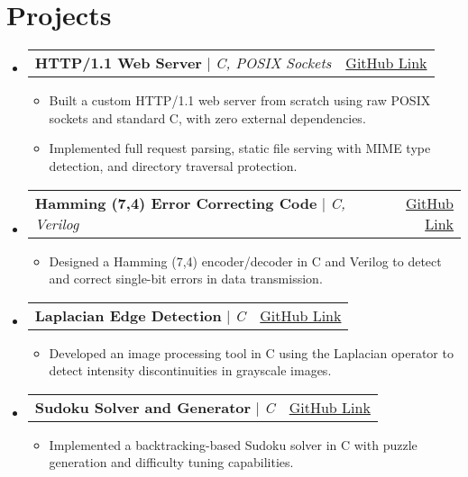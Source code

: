\documentclass[letterpaper,11pt]{article}
\makeatletter
\newcommand{\resumeItem}[1]{
  \item\small{
    {#1 \vspace{-2pt}}
  }
}
\newcommand{\resumeProjectHeading}[2]{
    \item
    \begin{tabular*}{0.97\textwidth}{l@{\extracolsep{\fill}}r}
      \small#1 & #2 \\
    \end{tabular*}\vspace{-7pt}
}
\newcommand{\resumeSubHeadingListStart}{\begin{itemize}[leftmargin=0.15in, label={}]}
\newcommand{\resumeSubHeadingListEnd}{\end{itemize}}
\newcommand{\resumeItemListStart}{\begin{itemize}}
\newcommand{\resumeItemListEnd}{\end{itemize}\vspace{-5pt}}
\makeatother
\begin{document}
\section{Projects}
  \resumeSubHeadingListStart
    \resumeProjectHeading
        {\textbf{HTTP/1.1 Web Server} $|$ \emph{C, POSIX Sockets}}{\href{https://github.com/Aditya-1020/Criver}{GitHub Link}}
        \resumeItemListStart
          \resumeItem{Built a custom HTTP/1.1 web server from scratch using raw POSIX sockets and standard C, with zero external dependencies.}
          \resumeItem{Implemented full request parsing, static file serving with MIME type detection, and directory traversal protection.}
        \resumeItemListEnd
    \resumeProjectHeading
        {\textbf{Hamming (7,4) Error Correcting Code} $|$ \emph{C, Verilog}}{\href{https://github.com/Aditya-1020/Hamming_7-4}{GitHub Link}}
        \resumeItemListStart
          \resumeItem{Designed a Hamming (7,4) encoder/decoder in C and Verilog to detect and correct single-bit errors in data transmission.}
        \resumeItemListEnd
    \resumeProjectHeading
        {\textbf{Laplacian Edge Detection} $|$ \emph{C}}{\href{https://github.com/Aditya-1020/Laplacian-edge}{GitHub Link}}
        \resumeItemListStart
          \resumeItem{Developed an image processing tool in C using the Laplacian operator to detect intensity discontinuities in grayscale images.}
        \resumeItemListEnd
    \resumeProjectHeading
        {\textbf{Sudoku Solver and Generator} $|$ \emph{C}}{\href{https://github.com/Aditya-1020/sudoku_solver}{GitHub Link}}
        \resumeItemListStart
          \resumeItem{Implemented a backtracking-based Sudoku solver in C with puzzle generation and difficulty tuning capabilities.}
        \resumeItemListEnd
  \resumeSubHeadingListEnd
\end{document}
